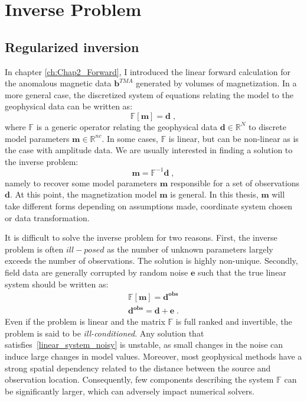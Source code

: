 \graphicspath{{./Figures/}}
\chapter{Inverse Problem}
\label{ch:Chap3_Inverse}

\section{Regularized inversion} \label{InverseMethod}
In chapter \ref{ch:Chap2_Forward}, I introduced the linear forward calculation for the anomalous magnetic data $\mathbf{b}^{TMA}$ generated by volumes of magnetization.
In a more general case, the discretized system of equations relating the model to the geophysical data can be written as: 
 \begin{equation} \label{linear_system}
  \mathbb{F}[\mathbf{m}] = \mathbf{d} \;,
\end{equation}
where $\mathbb{F}$ is a generic operator relating the geophysical data $\mathbf{d} \in \mathbb{R}^N$ to discrete model parameters $\mathbf{m} \in \mathbb{R}^{nc}$. 
In some cases, $\mathbb{F}$ is linear, but can be non-linear as is the case with amplitude data.
We are usually interested in finding a solution to the inverse problem:
\begin{equation}
\mathbf{m} = \mathbb{F}^{-1}\mathbf{d} \;,
\end{equation}
namely to recover some model parameters $\mathbf{m}$ responsible for a set of observations $\mathbf{d}$.
At this point, the magnetization model $\mathbf{m}$ is general.
In this thesis, $\mathbf{m}$ will take different forms depending on assumptions made, coordinate system chosen or data transformation.  

It is difficult to solve the inverse problem for two reasons. 
First, the inverse problem is often $ill-posed$ as the number of unknown parameters largely exceeds the number of observations. The solution is highly non-unique.
Secondly, field data are generally corrupted by random noise $\mathbf{e}$ such that the true linear system should be written as:
 \begin{equation} \label{linear_system_noisy}
\begin{split}
 \mathbb{F}[\mathbf{m}] = \mathbf{d^{obs}} \\
 \mathbf{d^{obs} = d + e} \;.
\end{split}
\end{equation}
Even if the problem is linear and the matrix $ \mathbb{F}$ is full ranked and invertible, the problem is said to be \emph{ill-conditioned}.
Any solution that satisfies~\ref{linear_system_noisy} is unstable, as small changes in the noise can induce large changes in model values.
Moreover, most geophysical methods have a strong spatial dependency related to the distance between the source and observation location. 
Consequently, few components describing the system $ \mathbb{F}$ can be significantly larger, which can adversely impact numerical solvers.

